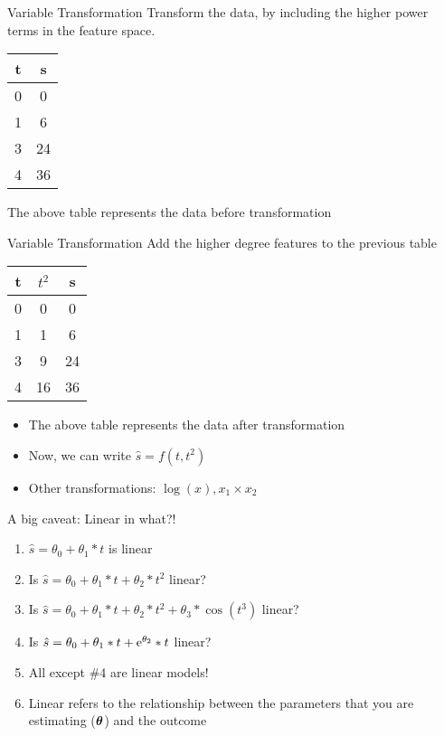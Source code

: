 \documentclass{beamer}
\begin{document}
\begin{frame}{Variable Transformation}
    Transform the data, by including the higher power terms in the feature space. 
    
       
    \begin{center}
 \begin{tabular}{||c c||} 
 \hline
 t  & s \\ [0.5ex] 
 \hline\hline
 0 & 0 \\
 1 & 6 \\
 3 & 24 \\
 4 & 36 \\
 \hline
\end{tabular}
\end{center}

The above table represents the data before transformation
\end{frame}


\begin{frame}{Variable Transformation}
Add the higher degree features to the previous table
    
       
    \begin{center}
 \begin{tabular}{||c c c||} 
 \hline
 t  & $t^{2}$ & s \\ [0.5ex] 
 \hline\hline
 0 & 0&0 \\
 1 & 1&6 \\
 3 & 9&24 \\
 4 & 16&36 \\
 \hline
\end{tabular}
\end{center}

\begin{itemize}[<+->]
    \item The above table represents the data after transformation
    \item Now, we can write $\hat{s}=f(t, t^2)$
    \item Other transformations: $\log(x), x_1\times x_2$
\end{itemize}
\end{frame}

\begin{frame}{A big caveat: Linear in what?!\footnotemark}
\begin{enumerate}[<+->]
	\item $\hat{s}=\theta_0 + \theta_1*t$
	 is linear
	 \item Is $\hat{s}=\theta_0 + \theta_1*t + \theta_2*t^2$
	 linear?
	 \item Is $\hat{s}=\theta_0 + \theta_1*t + \theta_2*t^2 + \theta_3*\cos(t^3)$
	 linear?
	\item Is $\hat{s}=\theta_0 + \theta_1*t + {\rm e}^{\theta_2}*t$
	linear?
	\item All except \#4 are linear models! 
	\item Linear refers to the relationship between the parameters that you are estimating ($\boldsymbol{\theta}$) and the outcome 
\end{enumerate}
\end{frame}
\end{document}
